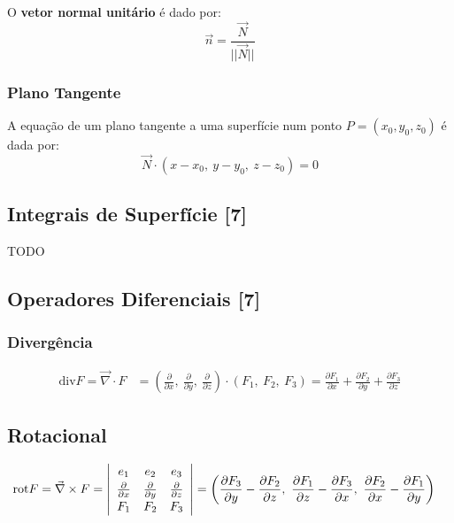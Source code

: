 \documentclass[11pt, a4paper]{article}
\begin{document}
O \textbf{vetor normal unitário} é dado por:
\begin{equation*}
    \vec{n} = \frac{\vec{N}}{||\vec{N}||}
\end{equation*}

\subsubsection{Plano Tangente}

A equação de um plano tangente a uma superfície num ponto $P = (x_0, y_0, z_0)$ é dada por:
\begin{equation*}
    \vec{N} \cdot \left(x - x_0,\ y - y_0,\ z - z_0\right) = 0
\end{equation*}

\subsection{Integrais de Superfície [7]}

TODO

\subsection{Operadores Diferenciais [7]}

\subsubsection{Divergência}

\begin{align*}
    \text{div} F = \vec{\nabla} \cdot F & = \left(\frac{\partial}{\partial x}
    ,\ \frac{\partial}{\partial y}
    ,\ \frac{\partial}{\partial z}\right)
    \cdot (F_1,\ F_2,\ F_3)
    = \frac{\partial F_1}{\partial x}
    + \frac{\partial F_2}{\partial y}
    + \frac{\partial F_3}{\partial z}
\end{align*}

\subsection{Rotacional}

\begin{align*}
    \text{rot} F = \vec{\nabla} \times F & =
    \left\vert
    \begin{array}{c c c}
        e_1                         & e_2 & e_3 \\[2pt]
        \frac{\partial}{\partial x} &
        \frac{\partial}{\partial y} &
        \frac{\partial}{\partial z}             \\[2pt]
        F_1                         & F_2 & F_3
    \end{array}
    \right\vert
    = \left(\frac{\partial F_3}{\partial y} - \frac{\partial F_2}{\partial z}
    ,\ \frac{\partial F_1}{\partial z} - \frac{\partial F_3}{\partial x}
    ,\ \frac{\partial F_2}{\partial x} - \frac{\partial F_1}{\partial y}
    \right)
\end{align*}
\end{document}
